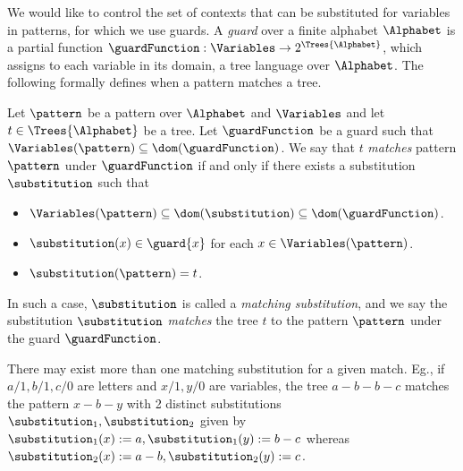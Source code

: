 We would like to control the set of contexts that can be substituted for variables in patterns, for which we use guards. A \emph{guard} over a finite alphabet  $\Alphabet$ is a partial function $\guardFunction : \Variables \to 2^{\Trees{\Alphabet}}$, which assigns to each variable in its domain, a tree language over $\Alphabet$. The following formally defines when a pattern matches a tree.

\begin{definition}[Match]\label{def:match}
Let $\pattern$ be a pattern over $\Alphabet$ and $\Variables$ and let $t \in
\Trees{\Alphabet}$ be a tree. Let $\guardFunction$ be a guard such
that $\Variables(\pattern) \subseteq \dom(\guardFunction)$. We say that
$t$ \emph{matches} pattern $\pattern$ under $\guardFunction$ if and only
if there exists a substitution $\substitution$ such that
  \begin{itemize}
    \item $\Variables(\pattern) \subseteq \dom(\substitution) \subseteq \dom(\guardFunction)$.
    \item $\substitution(x) \in \guard{x}$ for each $x \in
        \Variables(\pattern)$.
    \item $\substitution(\pattern) = t$.
  \end{itemize}
  In such a case, $\substitution$ is called a \emph{matching
  substitution}, and we say the substitution $\substitution$
  \emph{matches} the tree $t$ to the pattern $\pattern$ under the guard
  $\guardFunction$.
\end{definition}

There may exist more than one matching substitution for a given match.
Eg., if $a/1, b/1, c/0$ are letters and $x/1, y/0$ are variables, the tree $a-b-b-c$ matches the pattern $x-b-y$ with 2 distinct substitutions $\substitution_1, \substitution_2$ given by $\substitution_1(x) := a, \substitution_1(y) := b-c$ whereas $\substitution_2(x) := a-b, \substitution_2(y) := c$.

